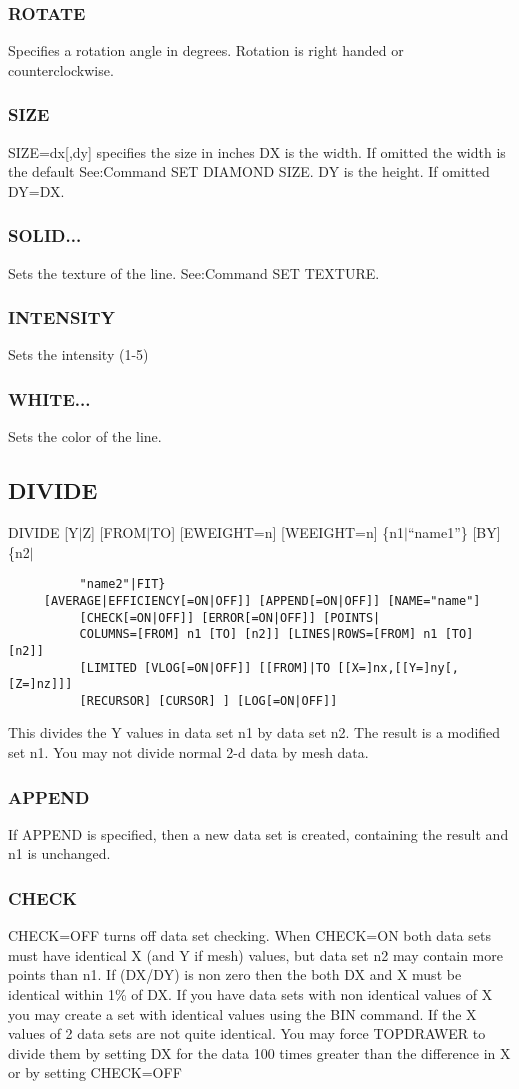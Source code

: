 \subsubsection{ROTATE}
Specifies  a  rotation  angle  in degrees.  Rotation is right handed or
counterclockwise.  
\subsubsection{SIZE}
SIZE=dx[,dy]  specifies the size in inches DX is the width.  If omitted
the width is the default  See:Command SET  DIAMOND  SIZE.   DY  is  the
height.  If omitted DY=DX.  
\subsubsection{SOLID...}
Sets the texture of the line.  See:Command SET TEXTURE.  
\subsubsection{INTENSITY}
Sets the intensity (1-5) 
\subsubsection{WHITE...}
Sets the color of the line.  
\subsection{DIVIDE}
DIVIDE [Y$|$Z] [FROM$|$TO] [EWEIGHT=n] [WEEIGHT=n] \{n1$|$``name1''\} [BY] \{n2$|$
\begin{verbatim}
          "name2"|FIT} 
     [AVERAGE|EFFICIENCY[=ON|OFF]] [APPEND[=ON|OFF]] [NAME="name"]
          [CHECK[=ON|OFF]] [ERROR[=ON|OFF]] [POINTS|
          COLUMNS=[FROM] n1 [TO] [n2]] [LINES|ROWS=[FROM] n1 [TO] [n2]]
          [LIMITED [VLOG[=ON|OFF]] [[FROM]|TO [[X=]nx,[[Y=]ny[,[Z=]nz]]]
          [RECURSOR] [CURSOR] ] [LOG[=ON|OFF]] 
\end{verbatim}
This divides the Y values in data set n1 by data set n2.  The result is a
modified set n1.  You may not divide normal 2-d data by mesh data.  
\subsubsection{APPEND}
If  APPEND is specified, then a new data set is created, containing the
result and n1 is unchanged.  
\subsubsection{CHECK}
CHECK=OFF  turns  off  data set checking.  When CHECK=ON both data sets
must have identical X (and Y if mesh)  values,  but  data  set  n2  may
contain  more  points than n1.  If (DX/DY) is non zero then the both DX
and X must be identical within 1\% of DX.  If you have  data  sets  with
non  identical  values  of X you may create a set with identical values
using the BIN command.  If the X values of 2 data sets  are  not  quite
identical.   You  may  force TOPDRAWER to divide them by setting DX for
the data 100 times greater than the  difference  in  X  or  by  setting
CHECK=OFF 

